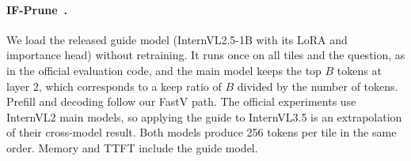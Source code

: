 \paragraph{IF-Prune~\cite{ifprune}.}
We load the released guide model (InternVL2.5-1B with its LoRA and importance head) without retraining. It runs once on
all tiles and the question, as in the official evaluation code, and the main model keeps the top $B$ tokens at layer
2, which corresponds to a keep ratio of $B$ divided by the number of tokens. Prefill and decoding follow our FastV
path. The official experiments use InternVL2 main models, so applying the guide to InternVL3.5 is an extrapolation of
their cross-model result. Both models produce 256 tokens per tile in the same order. Memory and TTFT include the guide model.
